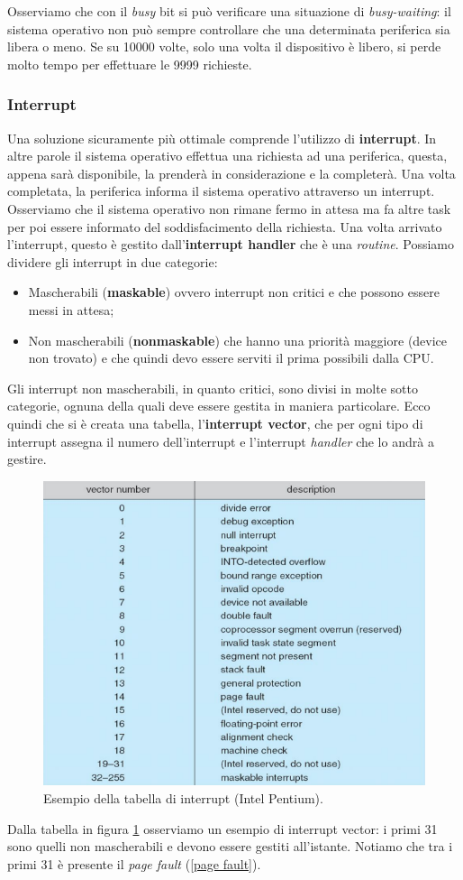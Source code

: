 Osserviamo che con il \textit{busy} bit si può verificare una situazione di \textit{busy-waiting}: il sistema operativo non può sempre controllare che una determinata periferica sia libera o meno. Se su 10000 volte, solo una volta il dispositivo è libero, si perde molto tempo per effettuare le 9999 richieste.

% 
\subsubsection{Interrupt}\label{interrupt handler}
Una soluzione sicuramente più ottimale comprende l'utilizzo di \textbf{interrupt}. In altre parole il sistema operativo effettua una richiesta ad una periferica, questa, appena sarà disponibile, la prenderà in considerazione e la completerà. Una volta completata, la periferica informa il sistema operativo attraverso un interrupt. Osserviamo che il sistema operativo non rimane fermo in attesa ma fa altre task per poi essere informato del soddisfacimento della richiesta. Una volta arrivato l'interrupt, questo è gestito dall'\textbf{interrupt handler} che è una \textit{routine}. Possiamo dividere gli interrupt in due categorie:
\vspace{-5px}
\begin{itemize}
\setlength{\itemsep}{-.15 em}
    \item Mascherabili (\textbf{maskable}) ovvero interrupt non critici e che possono essere messi in attesa;
    \item Non mascherabili (\textbf{nonmaskable}) che hanno una priorità maggiore (device non trovato) e che quindi devo essere serviti il prima possibili dalla CPU.
\end{itemize}

Gli interrupt non mascherabili, in quanto critici, sono divisi in molte sotto categorie, ognuna della quali deve essere gestita in maniera particolare. Ecco quindi che si è creata una tabella, l'\textbf{interrupt vector}, che per ogni tipo di interrupt assegna il numero dell'interrupt e l'interrupt \textit{handler} che lo andrà a gestire.
\begin{figure}[h]
    \centering
    \includegraphics[width = .6\textwidth]{../res/imgs/IO system/interrupt_vector.png}
    \caption{Esempio della tabella di interrupt (Intel Pentium).}
    \label{fig:interruptVector}
\end{figure}
Dalla tabella in figura \ref{fig:interruptVector} osserviamo un esempio di interrupt vector: i primi 31 sono quelli non mascherabili e devono essere gestiti all'istante. Notiamo che tra i primi 31 è presente il \textit{page fault }(\ref{page fault}).

